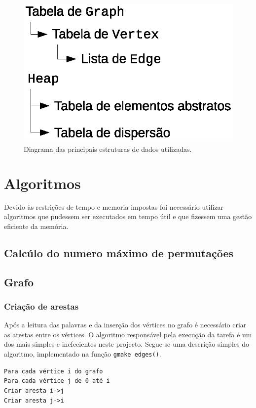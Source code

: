 \documentclass[portuguese, a4paper]{article}
\newcommand\tu[0]{\textunderscore}
\begin{document}
	\begin{figure}[H]
		\centering
		\includegraphics[width=0.4\linewidth]{data}
		\caption{Diagrama das principais estruturas de dados utilizadas.}
	\end{figure}


\section{Algoritmos}
\label{sec:alg}
	\par
	Devido às restrições de tempo e memoria impostas foi
	necessário utilizar algoritmos que pudessem ser executados em tempo útil e
	que fizessem uma gestão eficiente da memória.

	\subsection{Calcúlo do numero máximo de permutações}
	\par
	\texttt{}
	\subsection{Grafo}
	\subsubsection{Criação de arestas}
	\par
	Após a leitura das palavras e da inserção dos vértices no grafo é necessário
	criar as arestas entre os vértices. O algoritmo responsável pela execução
	da tarefa é um dos mais simples e inefecientes neste projecto. Segue-se uma
	descrição simples do algoritmo, implementado na função \texttt{g\tu make\tu
	edges()}.

	\par\null\par
	\texttt{Para cada vértice i do grafo}\\
	\indent\indent\texttt{Para cada vértice j de 0 até i}\\
	\indent\indent\indent\texttt{Criar aresta i->j}\\
	\indent\indent\indent\texttt{Criar aresta j->i}\\
\end{document}
